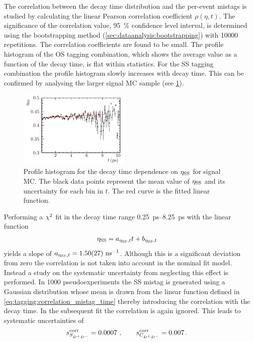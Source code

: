 The correlation between the decay time distribution and the per-event mistags
is studied by calculating the linear Pearson correlation coefficient
$\rho(\eta,t)$. The significance of the correlation value, \ie
\SI{95}{\percent} confidence level interval, is determined using the
bootstrapping method (\cref{sec:dataanalysis:bootstrapping}) with \num{10000}
repetitions. The correlation coefficients are found to be small. The profile
histogram of the OS tagging combination, which shows the average \etaos value
as a function of the decay time, is flat within statistics. For the SS tagging
combination the profile histogram slowly increases with decay time. This can
be confirmed by analysing the larger signal MC sample (see
\cref{fig:b02dd:systematics:correlation_mistag_time:etass_time_profile_MC}).
\begin{figure}[htb]
\centering
\includegraphics[width=0.49\textwidth]{07-B02DD/tikz/pdf/Profile_DecayTime_SS.pdf}
\caption{Profile histogram for the decay time dependence on $\etass$ for
signal MC. The black data points represent the mean value of $\etass$ and its
uncertainty for each bin in $t$. The red curve is the fitted linear function.}
\label{fig:b02dd:systematics:correlation_mistag_time:etass_time_profile_MC}
\end{figure}
Performing a $\chisq$ fit in the decay time range \SIrange{0.25}{8.25}{\ps}
with the linear function
\begin{align}
  \etass = a_{\etass,t} t + b_{\etass,t}
  \label{eq:tagging:correlation_mistag_time}
\end{align}
yields a slope of $a_{\etass,t} = \SI{1.50\pm0.27}{\invns}$. Although this is
a significant deviation from zero the correlation is not taken into account in
the nominal fit model. Instead a study on the systematic uncertainty from
neglecting this effect is performed. In \num{1000} pseudoexperiments the SS
mistag is generated using a Gaussian distribution whose mean is drawn from the
linear function defined in \cref{eq:tagging:correlation_mistag_time} thereby
introducing the correlation with the decay time. In the subsequent fit the
correlation is again ignored. This leads to systematic uncertainties of
\begin{align*}
s_{\SDD}^{\text{corr}} = \num{0.0007}\ , \qquad s_{\CDD}^{\text{corr}} = \num{0.007}\,.
\end{align*}

